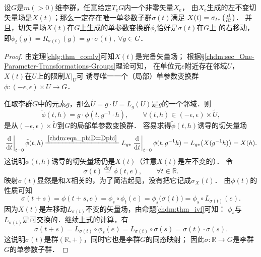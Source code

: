 

\begin{theorem}\label{chlg:thm_oglsv}
    设$G$是$m(>0)$维李群，任意给定$T_e G$内一个非零矢量$X_e$，
    由$X_e$生成的左不变切矢量场是$X(t)$；那么一定存在唯一单参数子群$\sigma(t)$满足
     $X(t)=\sigma_{t*}\left(\frac{{\rm d}}{{\rm d}t}\right)$．
    并且，切矢量场$X(t)$在$G$上生成的单参数变换群$\phi_t$恰好是$\sigma(t)$在$G$上
    的右移动，即$\phi_t(g)=R_{\sigma(t)}(g)=g\cdot \sigma(t),\ \forall g\in G$．
\end{theorem}
\begin{proof}
    由定理\ref{chlg:thm_comlv}可知$X(t)$是完备矢量场；
根据\S\ref{chdm:sec_One-Parameter-Transformations-Groups}理论可知，
在单位元$e$附近存在邻域$U$，$X(t)$在$U$上的限制$X|_U$可
诱导唯一一个（局部）单参数变换群$\phi:(-\epsilon,\epsilon)\times U\to G$．

任取李群$G$中的元素$g$，那么$\tilde{U}=g\cdot U=L_g(U)$是$g$的一个邻域．则
\begin{equation}
    \tilde{\phi}(t,h)=g\cdot \phi(t,g^{-1}\cdot h),\qquad
    \forall (t,h)\in (-\epsilon,\epsilon)\times \tilde{U},
\end{equation}
是从$(-\epsilon,\epsilon)\times \tilde{U}$到$G$的局部单参数变换群．
容易求得$\tilde{\phi}(t,h)$诱导的切矢量场
\begin{equation}
    \left. \frac{{\rm d}}{{\rm d}t}\right|_{t=0}\tilde{\phi}(t,h)
    \xlongequal{\ref{chdm:eqn_phiD=Dphi}}
    L_{g*}\left. \frac{{\rm d}}{{\rm d}t}\right|_{t=0} \phi(t,g^{-1}h)
    =L_{g*} \bigl(X(g^{-1}h)\bigr) = X(h).
\end{equation}
这说明$\tilde{\phi}(t,h)$诱导的切矢量场仍是$X(t)$（注意$X(t)$是左不变的）．
令
\begin{equation}\label{chlg:eqn_opsi}
    \sigma(t) \overset{def}{=} \phi(t,e),\qquad \forall t\in \mathbb{R}.
\end{equation}
映射$\sigma(t)$显然是和$X$相关的，为了简洁起见，没有把它记成$\sigma_X(t)$．
由$\phi(t)$的性质可知
\begin{equation}
    \sigma(t+s)=\phi(t+s,e)=\phi_s \circ \phi_t(e) = \phi_s\bigl(\sigma(t)\bigr)
    = \phi_s\circ L_{\sigma(t)}(e) .
\end{equation}
因为$X(t)$是左移动$L_{\sigma(t)}$不变的矢量场，由命题\ref{chdm:thm_ivf}可知：
$\phi_s$与$L_{\sigma(t)}$是可交换的．继续上式的计算，有
\begin{equation}
    \sigma(t+s)=L_{\sigma(t)} \circ  \phi_s (e) =L_{\sigma(t)} \circ \sigma(s)
    =\sigma(t) \cdot \sigma(s) .
\end{equation}
这说明$\sigma(t)$是群$(\mathbb{R},+)$，同时它也是李群$G$的同态映射；
因此$\sigma:\mathbb{R}\to G$是李群$G$的单参数子群．


\end{proof}
